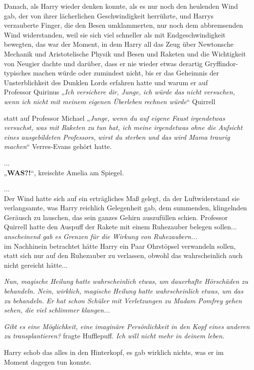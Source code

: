 {Danach, als Harry wieder denken konnte, als es nur noch den heulenden Wind gab, der von ihrer lächerlichen Geschwindigkeit herrührte, und Harrys verzauberte Finger, die den Besen umklammerten, nur noch dem abbremsenden Wind widerstanden, weil sie sich viel schneller als mit Endgeschwindigkeit bewegten, das war der Moment, in dem Harry all das Zeug über Newtonsche Mechanik und Aristotelische Physik und Besen und Raketen und die Wichtigkeit von Neugier dachte und darüber, dass er nie wieder etwas derartig Gryffindor-typisches machen würde oder zumindest nicht, bis er das Geheimnis der Unsterblichkeit des Dunklen Lords erfahren hatte und warum er auf\\ Professor Quirinus „\emph{Ich versichere dir, Junge, ich würde das nicht versuchen, wenn ich nicht mit meinem eigenen Überleben rechnen würde}“ Quirrell

statt auf Professor Michael „\emph{Junge, wenn du auf eigene Faust irgendetwas versuchst, was mit Raketen zu tun hat, ich meine irgendetwas ohne die Aufsicht eines ausgebildeten Professors, wirst du sterben und das wird Mama traurig machen}“ Verres-Evans gehört hatte.

...\\ „\textbf{WAS?!}“, kreischte Amelia am Spiegel.

...\\ Der Wind hatte sich auf ein erträgliches Maß gelegt, da der Luftwiderstand sie verlangsamte, was Harry reichlich Gelegenheit gab, dem summenden, klingelnden Geräusch zu lauschen, das sein ganzes Gehirn auszufüllen schien. Professor Quirrell hatte den Auspuff der Rakete mit einem Ruhezauber belegen sollen...\\ \emph{anscheinend gab es Grenzen für die Wirkung von Ruhezaubern...}\\ im Nachhinein betrachtet hätte Harry ein Paar Ohrstöpsel verwandeln sollen, statt sich nur auf den Ruhezauber zu verlassen, obwohl das wahrscheinlich auch nicht gereicht hätte...

\emph{Nun, magische Heilung hatte wahrscheinlich etwas, um dauerhafte Hörschäden zu behandeln. Nein, wirklich, magische Heilung hatte wahrscheinlich etwas, um das zu behandeln. Er hat schon Schüler mit Verletzungen zu Madam Pomfrey gehen sehen, die viel schlimmer klangen...}

\emph{Gibt es eine Möglichkeit, eine imaginäre Persönlichkeit in den Kopf eines anderen zu transplantieren?} fragte Hufflepuff. \emph{Ich will nicht mehr in deinem leben.}

Harry schob das alles in den Hinterkopf, es gab wirklich nichts, was er im Moment dagegen tun konnte.

}
